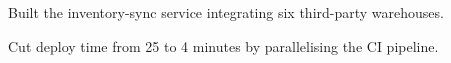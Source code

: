 \begin{bullets}
  \item Built the inventory-sync service integrating six third-party warehouses.
  \item Cut deploy time from 25 to 4 minutes by parallelising the CI pipeline.
\end{bullets}
